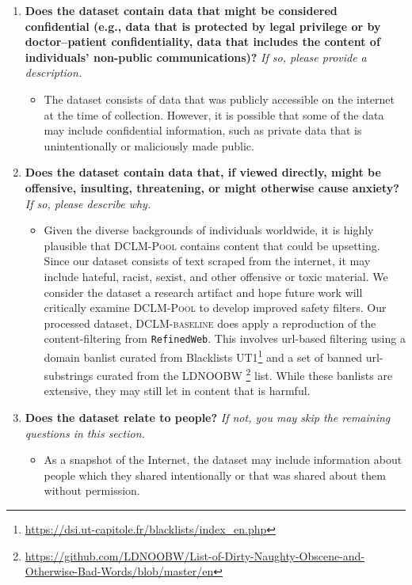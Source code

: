 \documentclass{article}
\newcommand{\rawpool}{\textsc{DCLM-Pool}\xspace}
\newcommand{\hqpool}{\textsc{DCLM-baseline}\xspace}
\newcommand{\rw}{\texttt{RefinedWeb}\xspace}
\begin{document}
\begin{enumerate}[label=Q\arabic*, resume]
\item \textbf{Does the dataset contain data that might be considered confidential (e.g., data that is protected by legal privilege or by doctor–patient confidentiality, data that includes the content of individuals’ non-public communications)?} \textit{If so, please provide a description.}

\begin{itemize}
\item The dataset consists of data that was publicly accessible on the internet at the time of collection. However, it is possible that some of the data may include confidential information, such as private data that is unintentionally or maliciously made public.
\end{itemize}

\item \textbf{Does the dataset contain data that, if viewed directly, might be offensive, insulting, threatening, or might otherwise cause anxiety?} \textit{If so, please describe why.}

\begin{itemize}
\item Given the diverse backgrounds of individuals worldwide, it is highly plausible that \rawpool contains content that could be upsetting. Since our dataset consists of text scraped from the internet, it may include hateful, racist, sexist, and other offensive or toxic material. We consider the dataset a research artifact and hope future work will critically examine \rawpool to develop improved safety filters.
Our processed dataset, \hqpool does apply a reproduction of the content-filtering from \rw. This involves url-based filtering using a domain banlist curated from Blacklists UT1\footnote{\url{https://dsi.ut-capitole.fr/blacklists/index_en.php}} and a set of banned url-substrings curated from the LDNOOBW \footnote{\url{https://github.com/LDNOOBW/List-of-Dirty-Naughty-Obscene-and-Otherwise-Bad-Words/blob/master/en}} list. While these banlists are extensive, they may still let in content that is harmful.
\end{itemize}

\item \textbf{Does the dataset relate to people?} \textit{If not, you may skip the remaining questions in this section.}

\begin{itemize}
\item As a snapshot of the Internet, the dataset may include information about people which they shared intentionally or that was shared about them without permission.
\end{itemize}


\end{enumerate}
\end{document}
